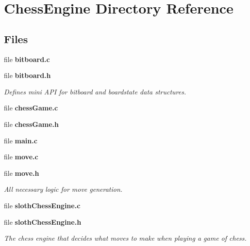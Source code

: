 \section{Chess\+Engine Directory Reference}
\label{dir_eeb4883815bdc01c5e7078f2f34e3db8}
\subsection*{Files}
\begin{DoxyCompactItemize}
\item 
file {\bf bitboard.\+c}
\item 
file {\bf bitboard.\+h}
\begin{DoxyCompactList}\small\item\em Defines mini A\+P\+I for bitboard and boardstate data structures. \end{DoxyCompactList}\item 
file {\bf chess\+Game.\+c}
\item 
file {\bf chess\+Game.\+h}
\item 
file {\bf main.\+c}
\item 
file {\bf move.\+c}
\item 
file {\bf move.\+h}
\begin{DoxyCompactList}\small\item\em All necessary logic for move generation. \end{DoxyCompactList}\item 
file {\bf sloth\+Chess\+Engine.\+c}
\item 
file {\bf sloth\+Chess\+Engine.\+h}
\begin{DoxyCompactList}\small\item\em The chess engine that decides what moves to make when playing a game of chess. \end{DoxyCompactList}\end{DoxyCompactItemize}

